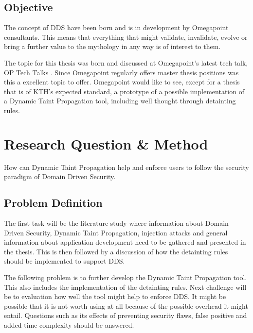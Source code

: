 \documentclass{../kththesis}
\begin{document}
\section{Objective}
The concept of DDS have been born and is in development by Omegapoint consultants. This means that everything that might validate, invalidate, evolve or bring a further value to the mythology in any way is of interest to them. 

The topic for this thesis was born and discussed at Omegapoint's latest tech talk, OP Tech Talks \parencite{Tardell}. Since Omegapoint regularly offers master thesis positions was this a excellent topic to offer. Omegapoint would like to see, except for a thesis that is of KTH's expected standard, a prototype of a possible implementation of a Dynamic Taint Propagation tool, including well thought through detainting rules.



\chapter{Research Question \& Method}
How can Dynamic Taint Propagation help and enforce users to follow the security paradigm of Domain Driven Security.


\section{Problem Definition}
The first task will be the literature study where information about Domain Driven Security, Dynamic Taint Propagation, injection attacks and general information about application development need to be gathered and presented in the thesis. This is then followed by a discussion of how the detainting rules should be implemented to support DDS. 

The following problem is to further develop the Dynamic Taint Propagation tool. This also includes the implementation of the detainting rules. Next challenge will be to evaluation how well the tool might help to enforce DDS. It might be possible that it is not worth using at all because of the possible overhead it might entail. Questions such as its effects of preventing security flaws, false positive and added time complexity should be answered.
\end{document}
